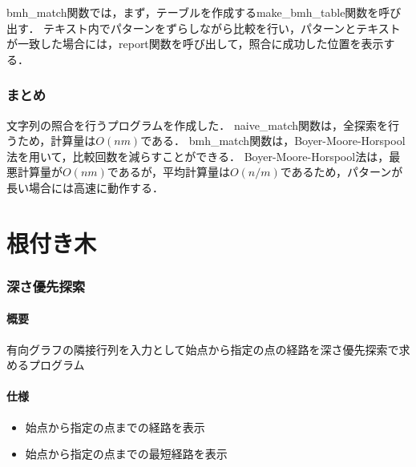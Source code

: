 \documentclass{ltjsarticle}
\begin{document}
bmh\_match関数では，まず，テーブルを作成するmake\_bmh\_table関数を呼び出す．
テキスト内でパターンをずらしながら比較を行い，パターンとテキストが一致した場合には，report関数を呼び出して，照合に成功した位置を表示する．

\section{まとめ}
文字列の照合を行うプログラムを作成した．
naive\_match関数は，全探索を行うため，計算量は$O(nm)$である．
bmh\_match関数は，Boyer-Moore-Horspool法を用いて，比較回数を減らすことができる．
Boyer-Moore-Horspool法は，最悪計算量が$O(nm)$であるが，平均計算量は$O(n/m)$であるため，パターンが長い場合には高速に動作する．

\part{根付き木}
\section{深さ優先探索}
\subsection{概要}
有向グラフの隣接行列を入力として始点から指定の点の経路を深さ優先探索で求めるプログラム

\subsection{仕様}
\begin{itemize}
  \item 始点から指定の点までの経路を表示
  \item 始点から指定の点までの最短経路を表示
\end{itemize}
\end{document}
